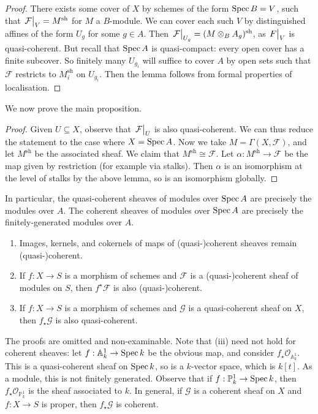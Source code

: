 \begin{proof}
    There exists some cover of \( X \) by schemes of the form \( \operatorname{Spec} B = V \), such that \( \eval{\mathcal F}_V = M^{\mathrm{sh}} \) for \( M \) a \( B \)-module.
    We can cover each such \( V \) by distinguished affines of the form \( U_g \) for some \( g \in A \).
    Then \( \eval{\mathcal F}_{U_g} = (M \otimes_B A_g)^{\mathrm{sh}} \), as \( \eval{F}_V \) is quasi-coherent.
    But recall that \( \operatorname{Spec} A \) is quasi-compact: every open cover has a finite subcover.
    So finitely many \( U_{g_i} \) will suffice to cover \( A \) by open sets such that \( \mathcal F \) restricts to \( M_i^{\mathrm{sh}} \) on \( U_{g_i} \).
    Then the lemma follows from formal properties of localisation.
\end{proof}
We now prove the main proposition.
\begin{proof}
    Given \( U \subseteq X \), observe that \( \eval{\mathcal F}_U \) is also quasi-coherent.
    We can thus reduce the statement to the case where \( X = \operatorname{Spec} A \).
    Now we take \( M = \Gamma(X, \mathcal F) \), and let \( M^{\mathrm{sh}} \) be the associated sheaf.
    We claim that \( M^{\mathrm{sh}} \cong \mathcal F \).
    Let \( \alpha : M^{\mathrm{sh}} \to \mathcal F \) be the map given by restriction (for example via stalks).
    Then \( \alpha \) is an isomorphism at the level of stalks by the above lemma, so is an isomorphism globally.
\end{proof}
In particular, the quasi-coherent sheaves of modules over \( \operatorname{Spec} A \) are precisely the modules over \( A \).
The coherent sheaves of modules over \( \operatorname{Spec} A \) are precisely the finitely-generated modules over \( A \).
\begin{proposition}
    \begin{enumerate}
        \item Images, kernels, and cokernels of maps of (quasi-)coherent sheaves remain (quasi-)coherent.
        \item If \( f : X \to S \) is a morphism of schemes and \( \mathcal F \) is a (quasi-)coherent sheaf of modules on \( S \), then \( f^\star \mathcal F \) is also (quasi-)coherent.
        \item If \( f : X \to S \) is a morphism of schemes and \( \mathcal G \) is a quasi-coherent sheaf on \( X \), then \( f_\star \mathcal G \) is also quasi-coherent.
    \end{enumerate}
\end{proposition}
The proofs are omitted and non-examinable.
Note that (iii) need not hold for coherent sheaves: let \( f : \mathbb A^1_k \to \operatorname{Spec} k \) be the obvious map, and consider \( f_\star \mathcal O_{\mathbb A^1_k} \).
This is a quasi-coherent sheaf on \( \operatorname{Spec} k \), so is a \( k \)-vector space, which is \( k[t] \).
As a module, this is not finitely generated.
Observe that if \( f : \mathbb P^1_k \to \operatorname{Spec} k \), then \( f_\star \mathcal O_{\mathbb P^1_k} \) is the sheaf associated to \( k \).
In general, if \( \mathcal G \) is a coherent sheaf on \( X \) and \( f : X \to S \) is proper, then \( f_\star \mathcal G \) is coherent.

